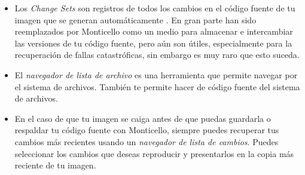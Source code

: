 \documentclass[spanish,a4paper,10pt,twoside]{book}
\begin{document}
\begin{itemize}
{  mensajes} son dos herramientas para localizar m\'etodos. El primero de ellos es m\'as \'util cuando no est\'as seguro del nombre , pero no saben el comportamiento esperado. La segunda ofrece una interfaz de navegaci\'on mas avanzada cuando conoces al menos un fragmento del nombre.
  \item Los \emph{Change Sets} son registros de todos los cambios en el c\'odigo
  fuente de tu imagen que se generan autom\'aticamente . En gran parte han sido reemplazados por Monticello como un medio para almacenar e intercambiar las versiones de tu c\'odigo fuente, pero a\'un son \'utiles, especialmente para la recuperaci\'on de fallas catastr\'oficas, sin embargo es muy raro que esto suceda.
  \item El \emph{navegador de lista de archivo} es una herramienta que permite
  navegar por el sistema de archivos. Tambi\'en te permite hacer 
  de c\'odigo fuente del sistema de archivos.
  \item En el caso de que tu imagen se caiga antes de que puedas guardarla o
  respaldar tu c\'odigo fuente con Monticello, siempre puedes recuperar tus
  cambios m\'as recientes usando un \emph{navegador de lista de cambios}. Puedes
  seleccionar los cambios que deseas reproducir y presentarlos en la copia m\'as
  reciente de tu imagen.
\end{itemize}

\ifx\wholebook\relax\else
\end{document}
